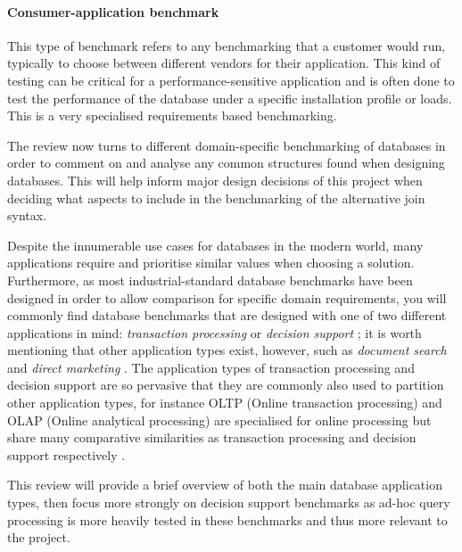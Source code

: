 \paragraph{Consumer-application benchmark} This type of benchmark refers to any
benchmarking that a customer would run, typically to choose between different
vendors for their application. This kind of testing can be critical for a
performance-sensitive application \cite{PractitionersIntroduction} and is often
done to test the performance of the database under a specific installation
profile \cite{DoingYourOwnBenchmark} or loads. This is a very specialised
requirements based benchmarking.

The review now turns to different domain-specific benchmarking of databases in
order to comment on and analyse any common structures found when designing
databases. This will help inform major design decisions of this project when
deciding what aspects to include in the benchmarking of the alternative join
syntax.

Despite the innumerable use cases for databases in the modern world, many
applications require and prioritise similar values when choosing a solution.
Furthermore, as most industrial-standard database benchmarks have been designed in
order to allow comparison for specific domain requirements, you will commonly
find database benchmarks that are designed with one of two different
applications in mind: \emph{transaction processing} or \emph{decision support}
\cite{PractitionersIntroduction}; it is worth mentioning that other application
types exist, however, such as \emph{document search} and \emph{direct marketing}
\cite{SetQueryBenchmark}. The application types of transaction processing and
decision support are so pervasive that they are commonly also used to partition
other application types, for instance OLTP (Online transaction processing) and
OLAP (Online analytical processing) are specialised for online processing but
share many comparative similarities as transaction processing and decision
support respectively \cite{OLTP-Oracle}.

This review will provide a brief overview of both
the main database application types, then focus more strongly on decision
support benchmarks as ad-hoc query processing is more heavily tested in these
benchmarks and thus more relevant to the project.

